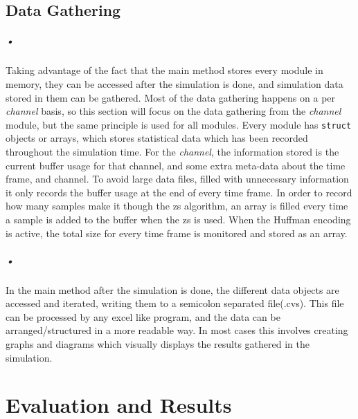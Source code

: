 \documentclass[a4paper, 12pt, openright, twoside]{report}
\newcommand{\codeword}[1]{\texttt{#1}}
\begin{document}
\begin{minipage}{\linewidth}

\end{minipage}

\section{Data Gathering}

\paragraph{•}
Taking advantage of the fact that the main method stores every module in memory, they can be accessed after the simulation is done, and simulation data stored in them can be gathered.
Most of the data gathering happens on a per \textit{channel} basis, so this section will focus on the data gathering from the \textit{channel} module, but the same principle is used for all modules.
Every module has \codeword{struct} objects or arrays, which stores statistical data which has been recorded throughout the simulation time.
For the \textit{channel}, the information stored is the current buffer usage for that channel, and some extra meta-data about the time frame, and channel.
To avoid large data files, filled with unnecessary information it only records the buffer usage at the end of every time frame.
In order to record how many samples make it though the \gls{zs} algorithm, an array is filled every time a sample is added to the buffer when the \gls{zs} is used.
When the Huffman encoding is active, the total size for every time frame is monitored and stored as an array.

\paragraph{•}
In the main method after the simulation is done, the different data objects are accessed and iterated, writing them to a semicolon separated file(.cvs).
This file can be processed by any excel like program, and the data can be arranged/structured in a more readable way.
In most cases this involves creating graphs and diagrams which visually displays the results gathered in the simulation.

\chapter{Evaluation and Results}
\end{document}
